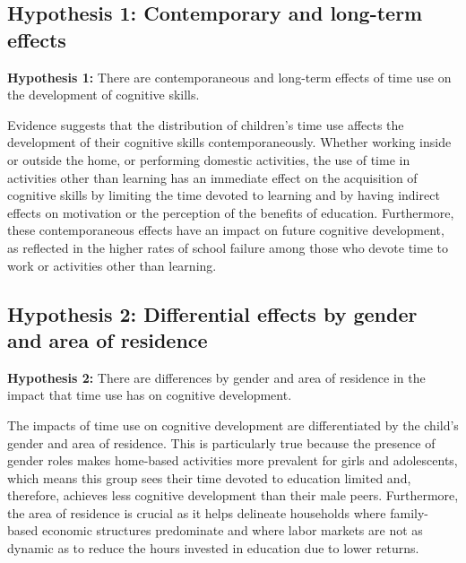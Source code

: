\documentclass[12pt]{article}
\begin{document}
\subsection{Hypothesis 1: Contemporary and long-term effects}
\label{subsec:hyp1}

\textbf{Hypothesis 1:} There are contemporaneous and long-term effects of
time use on the development of cognitive skills.

Evidence suggests that the distribution of children's time use affects the
development of their cognitive skills contemporaneously. Whether working inside
or outside the home, or performing domestic activities, the use of time in
activities other than learning has an immediate effect on the acquisition of
cognitive skills by limiting the time devoted to learning and by having
indirect effects on motivation or the perception of the benefits of education.
Furthermore, these contemporaneous effects have an impact on future cognitive
development, as reflected in the higher rates of school failure among those
who devote time to work or activities other than learning.

\subsection{Hypothesis 2: Differential effects by gender and area of residence}
\label{subsec:hyp2}

\textbf{Hypothesis 2:} There are differences by gender and area of residence
in the impact that time use has on cognitive development.

The impacts of time use on cognitive development are differentiated by the
child's gender and area of residence. This is particularly true because the
presence of gender roles makes home-based activities more prevalent for girls
and adolescents, which means this group sees their time devoted to education
limited and, therefore, achieves less cognitive development than their male
peers. Furthermore, the area of residence is crucial as it helps delineate
households where family-based economic structures predominate and where labor
markets are not as dynamic as to reduce the hours invested in education due
to lower returns.
\end{document}
